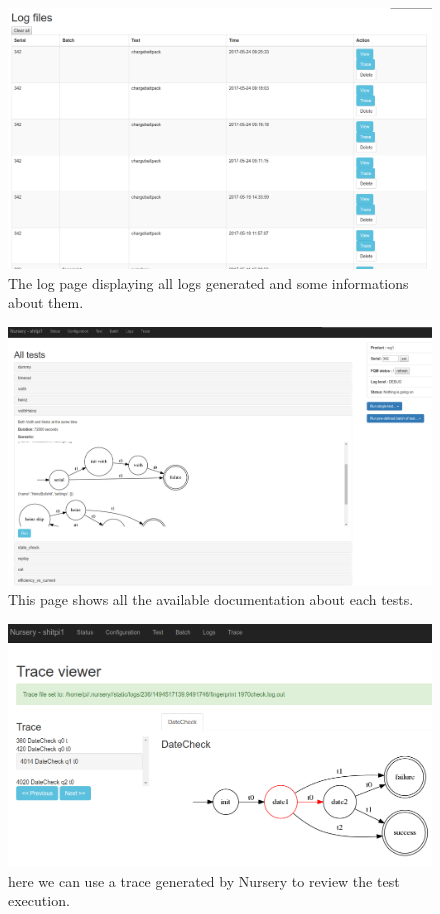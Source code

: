 \documentclass[12pt]{article}
\theoremstyle{definition}
\theoremstyle{definition}
\theoremstyle{remark}
\begin{document}
\begin{figure}
    \centering
    \includegraphics[scale=0.4]{wa_logs.png}
    \caption{The log page displaying all logs generated and some informations about them.}
    \label{wa_logs}
\end{figure}

\begin{figure}
    \centering
    \includegraphics[scale=0.2]{wa_tests_doc.png}
    \caption{This page shows all the available documentation about each tests.}
    \label{wa_tests_doc}
\end{figure}

\begin{figure}
    \centering
    \includegraphics[scale=0.4]{wa_trace.png}
    \caption{here we can use a trace generated by Nursery to review the test execution.}
    \label{wa_trace}
\end{figure}
\end{document}
